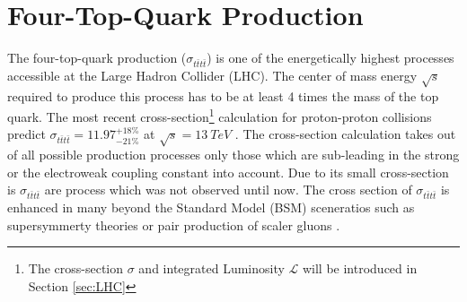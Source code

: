\section{Four-Top-Quark Production}
\label{sec:fourtops}
The four-top-quark production ($\sigma_{t\bar{t}t\bar{t}}$) is one of the energetically highest processes accessible at the Large Hadron Collider (LHC). The center of mass energy $\sqrt{s}$ required to produce this process has to be at least 4 times the mass of the top quark. The most recent cross-section\footnote{The cross-section $\sigma$ and integrated Luminosity $\mathcal{L}$ will be introduced in Section \ref{sec:LHC}} calculation for proton-proton collisions predict $\sigma_{t\bar{t}t\bar{t}}=11.97^{+18\%}_{-21\%}$ at $\sqrt{s} = \SI{13}{TeV}$ \cite{ttttcross}. The cross-section calculation takes out of all possible production processes only those which are sub-leading in the strong or the electroweak coupling constant into account. Due to its small cross-section is $\sigma_{t\bar{t}t\bar{t}}$ are process which was not observed until now. The cross section of $\sigma_{t\bar{t}t\bar{t}}$ is enhanced in many beyond the Standard Model (BSM) sceneratios such as supersymmerty theories \cite{SuperS} or pair production of scaler gluons \cite{ScalarDing}. \\

